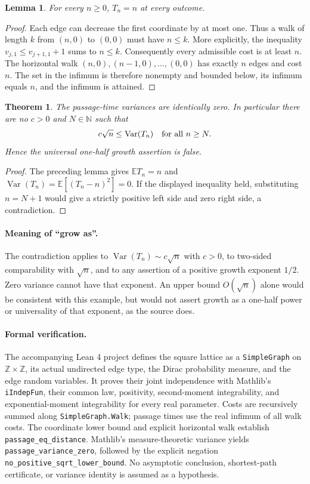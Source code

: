 \documentclass[11pt]{article}
\newtheorem{theorem}{Theorem}
\newtheorem{lemma}{Lemma}
\begin{document}
\begin{lemma}
For every $n\geq0$, $T_n=n$ at every outcome.
\end{lemma}
\begin{proof}
Each edge can decrease the first coordinate by at most one. Thus a walk of
length $k$ from $(n,0)$ to $(0,0)$ must have $n\leq k$. More explicitly,
the inequality $v_{j,1}\leq v_{j+1,1}+1$ sums to $n\leq k$.
Consequently every admissible cost is at least $n$. The horizontal walk
$(n,0),(n-1,0),\ldots,(0,0)$ has exactly $n$ edges and cost $n$.
The set in the infimum is therefore nonempty and bounded below, its infimum
equals $n$, and the infimum is attained.
\end{proof}

\begin{theorem}
The passage-time variances are identically zero. In particular there are no
$c>0$ and $N\in\mathbb N$ such that
\[
       c\sqrt n\leq\operatorname{Var}(T_n)\quad\hbox{for all }n\geq N.
\]
Hence the universal one-half growth assertion is false.
\end{theorem}
\begin{proof}
The preceding lemma gives $\mathbb E T_n=n$ and
$\operatorname{Var}(T_n)=\mathbb E[(T_n-n)^2]=0$.
If the displayed inequality held, substituting $n=N+1$ would give a strictly
positive left side and zero right side, a contradiction.
\end{proof}

\paragraph{Meaning of ``grow as''.}
The contradiction applies to $\operatorname{Var}(T_n)\sim c\sqrt n$ with
$c>0$, to two-sided comparability with $\sqrt n$, and to any assertion of
a positive growth exponent $1/2$. Zero variance cannot have that exponent.
An upper bound $O(\sqrt n)$ alone would be consistent with this example,
but would not assert growth as a one-half power or universality of that
exponent, as the source does.

\paragraph{Formal verification.}
The accompanying Lean 4 project defines the square lattice as a
\texttt{SimpleGraph} on $\mathbb Z\times\mathbb Z$, its actual undirected
edge type, the Dirac probability measure, and the edge random variables.
It proves their joint independence with Mathlib's \texttt{iIndepFun}, their
common law, positivity, second-moment integrability, and exponential-moment
integrability for every real parameter. Costs are recursively summed along
\texttt{SimpleGraph.Walk}; passage times use the real infimum of all walk
costs. The coordinate lower bound and explicit horizontal walk establish
\texttt{passage\_eq\_distance}. Mathlib's measure-theoretic variance yields
\texttt{passage\_variance\_zero}, followed by the explicit negation
\texttt{no\_positive\_sqrt\_lower\_bound}. No asymptotic conclusion, shortest-path
certificate, or variance identity is assumed as a hypothesis.
\end{document}

